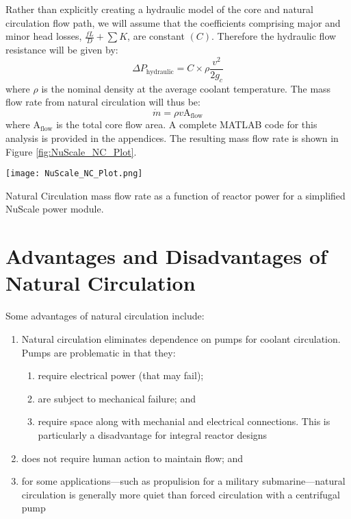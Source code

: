 Rather than explicitly creating a hydraulic model of the core and natural circulation flow path, we will assume that the coefficients comprising major and minor head losses, $\frac{fL}{D} + \sum{K}$, are constant $(C)$.  Therefore the hydraulic flow resistance will be given by:
$$\Delta P_{\text{hydraulic}} = C \times \rho \frac{v^2}{2 g_c}$$
where $\rho$ is the nominal density at the average coolant temperature.  The mass flow rate from natural circulation will thus be: 
$$\dot{m} = \rho v \text{A}_{\text{flow}}$$
where $\text{A}_{\text{flow}}$ is the total core flow area.  A complete MATLAB code for this analysis is provided in the appendices.  The resulting mass flow rate is shown in Figure \ref{fig:NuScale_NC_Plot}.
\begin{marginfigure}
\texttt{[image: NuScale\_NC\_Plot.png]}
\caption{Natural Circulation mass flow rate as a function of reactor power for a simplified NuScale power module.}
\label{fig:NuScale_NC_Plot}
\end{marginfigure}

\section{Advantages and Disadvantages of Natural Circulation}
Some advantages of natural circulation include:
\begin{enumerate}
\item Natural circulation eliminates dependence on pumps for coolant circulation. Pumps are problematic in that they:
\begin{enumerate}
\item require electrical power (that may fail);
\item are subject to mechanical failure; and
\item require space along with mechanial and electrical connections.  This is particularly a disadvantage for integral reactor designs
\end{enumerate}
\item does not require human action to maintain flow; and
\item for some applications---such as propulision for a military submarine---natural circulation is generally more quiet than forced circulation with a centrifugal pump
\end{enumerate}

